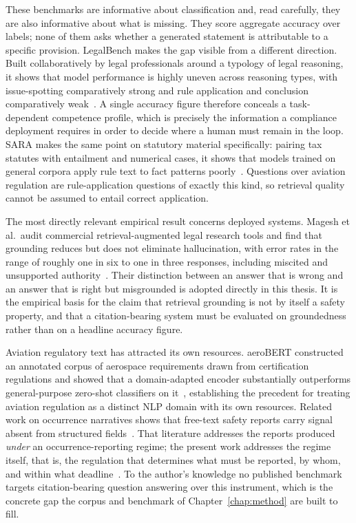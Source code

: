 These benchmarks are informative about classification and, read carefully, they are also informative about what is missing. They score aggregate accuracy over labels; none of them asks whether a generated statement is attributable to a specific provision. LegalBench makes the gap visible from a different direction. Built collaboratively by legal professionals around a typology of legal reasoning, it shows that model performance is highly uneven across reasoning types, with issue-spotting comparatively strong and rule application and conclusion comparatively weak~\cite{guha2023legalbench}. A single accuracy figure therefore conceals a task-dependent competence profile, which is precisely the information a compliance deployment requires in order to decide where a human must remain in the loop. SARA makes the same point on statutory material specifically: pairing tax statutes with entailment and numerical cases, it shows that models trained on general corpora apply rule text to fact patterns poorly~\cite{holzenberger2020sara}. Questions over aviation regulation are rule-application questions of exactly this kind, so retrieval quality cannot be assumed to entail correct application.

The most directly relevant empirical result concerns deployed systems. Magesh et al.\ audit commercial retrieval-augmented legal research tools and find that grounding reduces but does not eliminate hallucination, with error rates in the range of roughly one in six to one in three responses, including miscited and unsupported authority~\cite{magesh2025hallucination}. Their distinction between an answer that is wrong and an answer that is right but misgrounded is adopted directly in this thesis. It is the empirical basis for the claim that retrieval grounding is not by itself a safety property, and that a citation-bearing system must be evaluated on groundedness rather than on a headline accuracy figure.

Aviation regulatory text has attracted its own resources. aeroBERT constructed an annotated corpus of aerospace requirements drawn from certification regulations and showed that a domain-adapted encoder substantially outperforms general-purpose zero-shot classifiers on it~\cite{tikayatray2023aerobert}, establishing the precedent for treating aviation regulation as a distinct \ac{NLP} domain with its own resources. Related work on occurrence narratives shows that free-text safety reports carry signal absent from structured fields~\cite{miyamoto2022aviation}. That literature addresses the reports produced \emph{under} an occurrence-reporting regime; the present work addresses the regime itself, that is, the regulation that determines what must be reported, by whom, and within what deadline~\cite{eu2014reg376,easa2022easyaccess376}. To the author's knowledge no published benchmark targets citation-bearing question answering over this instrument, which is the concrete gap the corpus and benchmark of Chapter~\ref{chap:method} are built to fill.


